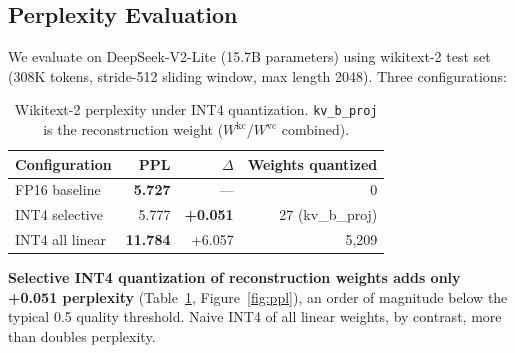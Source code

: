 \documentclass[10pt,twocolumn]{article}
\begin{document}
\subsection{Perplexity Evaluation}

We evaluate on DeepSeek-V2-Lite (15.7B parameters) using wikitext-2 test set (308K tokens, stride-512 sliding window, max length 2048).  Three configurations:

\begin{table}[h]
\centering
\small
\caption{Wikitext-2 perplexity under INT4 quantization.  \texttt{kv\_b\_proj} is the reconstruction weight ($W^\text{kc}$/$W^\text{vc}$ combined).}
\label{tab:ppl}
\begin{tabular}{@{}lrrr@{}}
\toprule
Configuration & PPL & $\Delta$ & Weights quantized \\
\midrule
FP16 baseline       & \textbf{5.727} & ---    & 0 \\
INT4 selective       & 5.777 & \textbf{+0.051} & 27 (kv\_b\_proj) \\
INT4 all linear      & \textbf{11.784} & +6.057 & 5,209 \\
\bottomrule
\end{tabular}
\end{table}

\textbf{Selective INT4 quantization of reconstruction weights adds only +0.051 perplexity} (Table~\ref{tab:ppl}, Figure~\ref{fig:ppl}), an order of magnitude below the typical 0.5 quality threshold.  Naive INT4 of all linear weights, by contrast, more than doubles perplexity.
\end{document}
